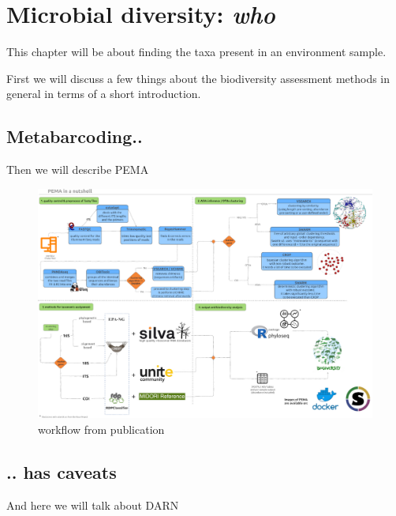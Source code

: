 
\chapter{Microbial diversity: \textit{who}}
\label{cha:2}

This chapter will be about finding the taxa present in an environment sample. 

First we will discuss a few things about the biodiversity assessment methods in general in terms of a short introduction. 


\section{Metabarcoding..}
Then we will describe PEMA


\begin{figure}{}
   \centering
   \includegraphics{figures/pema_workflow.jpeg}
   \caption{workflow from publication}
\end{figure}




\section{.. has caveats}

And here we will talk about DARN


